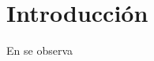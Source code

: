 \documentclass[conference]{IEEEtran}
\begin{document}
\pagestyle{plain}

\title{ }

\author{ }

\maketitle

\begin{abstract}

\end{abstract}

\begin{IEEEkeywords}

\end{IEEEkeywords}

\section{Introducción}

En \cite{Hennessy2019} se observa

\printbibliography[title=Referencias]
\end{document}
